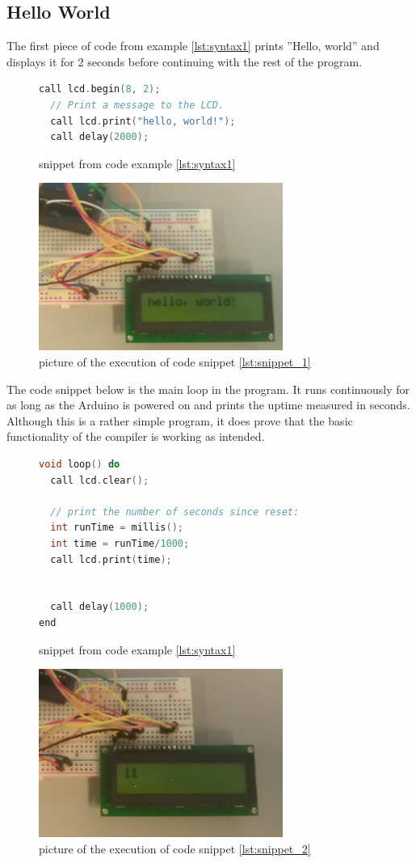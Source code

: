 \subsection*{Hello World}
The first piece of code from example \ref{lst:syntax1} prints ''Hello, world'' and displays it for 2 seconds before continuing with the rest of the program.
\begin{figure}[h]
\begin{lstlisting}[caption=Hello World ,firstnumber=11, language={C++}, label=lst:snippet_1]
  call lcd.begin(8, 2);
  // Print a message to the LCD.
  call lcd.print("hello, world!");
  call delay(2000);
\end{lstlisting}
\caption{snippet from code example \ref{lst:syntax1}}
\end{figure}
\begin{figure}[h]
\centering
\includegraphics[width=8cm]{billeder/test_hello_1.jpg}
\caption{picture of the execution of code snippet \ref{lst:snippet_1}}
\end{figure}

The code snippet below is the main loop in the program. It runs continuously for as long as the Arduino is powered on and prints the uptime measured in seconds. Although this is a rather simple program, it does prove that the basic functionality of the compiler is working as intended.
\begin{figure}[h]
\begin{lstlisting}[caption=Hello World ,firstnumber=17, language={C++},label=lst:snippet_2]
void loop() do
  call lcd.clear();

  // print the number of seconds since reset:
  int runTime = millis();
  int time = runTime/1000;
  call lcd.print(time);


  call delay(1000);
end
\end{lstlisting}
\caption{snippet from code example \ref{lst:syntax1}}
\end{figure}
\begin{figure}[htb]
\centering
\includegraphics[width=8cm]{billeder/test_hello_2.jpg}
\caption{picture of the execution of code snippet \ref{lst:snippet_2}}
\end{figure}

